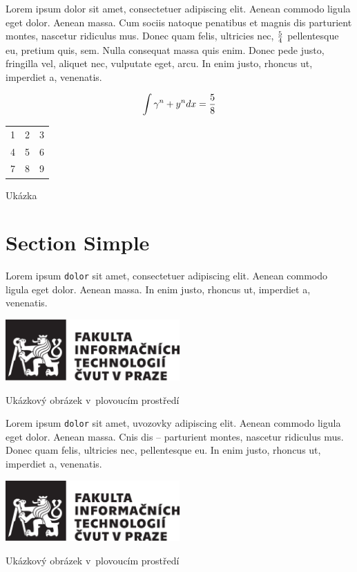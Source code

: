 Lorem ipsum dolor sit amet, consectetuer adipiscing elit. Aenean commodo ligula eget dolor. Aenean massa. Cum sociis natoque penatibus et magnis dis parturient montes, nascetur ridiculus mus. Donec quam felis, ultricies nec, \({5} \over {4}\) pellentesque eu, pretium quis, sem. Nulla consequat massa quis enim. Donec pede justo, fringilla vel, aliquet nec, vulputate eget, arcu. In enim justo, rhoncus ut, imperdiet a, venenatis.

\[ \int {\gamma^n + y^n } dx = { 5 \over 8} \]


\begin{fig:table}
   \begin{tabular}{| l c r |}
      \hline
      1 & 2 & 3 \\
      4 & 5 & 6 \\
      7 & 8 & 9 \\
      \hline
   \end{tabular}
   \caption{Ukázka }\label{tab:example1}
\end{fig:table}

\section{Section Simple}
Lorem ipsum \verb|dolor| sit amet, consectetuer adipiscing elit. Aenean commodo ligula eget dolor. Aenean massa. In enim justo, rhoncus ut, imperdiet a, venenatis.


\begin{fig:illustration}
	\includegraphics[width=0.5\textwidth, angle=30]{dependencies/CVUTLogo}
	\caption[První příklad obrázku]{Ukázkový obrázek v~plovoucím prostředí}\label{pic:example1}
\end{fig:illustration}


Lorem ipsum \verb|dolor| sit amet, uvozovky adipiscing elit. Aenean commodo ligula eget dolor. Aenean massa. Cnis dis -- parturient montes, nascetur ridiculus mus. Donec quam felis, ultricies nec, pellentesque eu. In enim justo, rhoncus ut, imperdiet a, venenatis.


\begin{fig:illustration}
	\includegraphics[width=0.5\textwidth]{dependencies/CVUTLogo}
	\caption[Druhý příklad obrázku]{Ukázkový obrázek v~plovoucím prostředí}\label{pic:example2}
\end{fig:illustration}

